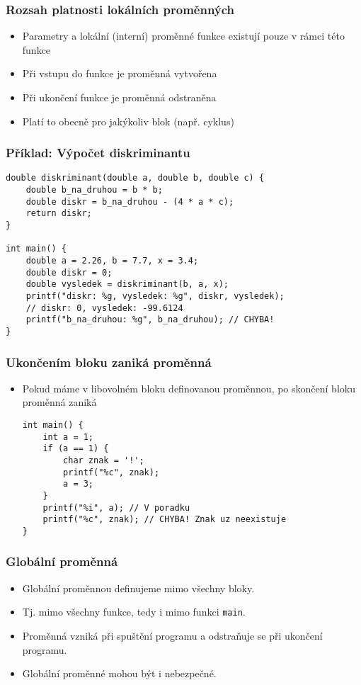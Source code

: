 \documentclass{beamer}
\newenvironment{itemizex}%
  {\large \begin{itemize}%
    \setlength{\itemsep}{8pt}%
    \setlength{\parskip}{8pt}}%
  {\end{itemize}}
\begin{document}
\begin{frame}[t,fragile]\frametitle{Rozsah platnosti lokálních proměnných} 
    \begin{itemizex}
        \item Parametry a lokální (interní) proměnné funkce existují pouze v rámci této funkce
        \item Při vstupu do funkce je proměnná vytvořena
        \item Při ukončení funkce je proměnná odstraněna
        \item Platí to obecně pro jakýkoliv blok (např. cyklus)
    \end{itemizex}
\end{frame}

\begin{frame}[t,fragile]\frametitle{Příklad: Výpočet diskriminantu} 
    \begin{verbatim} 
double diskriminant(double a, double b, double c) {
    double b_na_druhou = b * b;
    double diskr = b_na_druhou - (4 * a * c);
    return diskr;
}

int main() {
    double a = 2.26, b = 7.7, x = 3.4;
    double diskr = 0;
    double vysledek = diskriminant(b, a, x);
    printf("diskr: %g, vysledek: %g", diskr, vysledek);
    // diskr: 0, vysledek: -99.6124
    printf("b_na_druhou: %g", b_na_druhou); // CHYBA!
}
    \end{verbatim}
\end{frame}


\begin{frame}[t,fragile]\frametitle{Ukončením bloku zaniká proměnná} 
    \begin{itemizex}
        \item Pokud máme v libovolném bloku definovanou proměnnou, po skončení bloku proměnná zaniká
        \begin{verbatim} 
int main() {
    int a = 1;
    if (a == 1) {
        char znak = '!';
        printf("%c", znak);
        a = 3;
    }
    printf("%i", a); // V poradku
    printf("%c", znak); // CHYBA! Znak uz neexistuje
}
        \end{verbatim}
    \end{itemizex}
\end{frame}


\begin{frame}[t,fragile]\frametitle{Globální proměnná} 
    \begin{itemizex}
        \item Globální proměnnou definujeme mimo všechny bloky.
        \item Tj. mimo všechny funkce, tedy i mimo funkci \texttt{main}.
        \item Proměnná vzniká při spuštění programu a odstraňuje se při ukončení programu.
        \item Globální proměnné mohou být i nebezpečné.
    \end{itemizex}
\end{frame}
\end{document}
